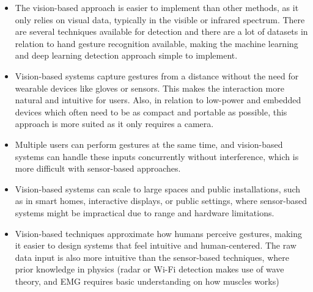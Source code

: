 \documentclass[12pt]{article}
\begin{document}
  \begin{itemize}
    \item The vision-based approach is easier to implement than other methods, as it only relies on visual data, typically in the visible or infrared spectrum. There are several techniques available for detection and there are a lot of datasets in relation to hand gesture recognition available, making the machine learning and deep learning detection approach simple to implement. 
    \item Vision-based systems capture gestures from a distance without the need for wearable devices like gloves or sensors. This makes the interaction more natural and intuitive for users. Also, in relation to low-power and embedded devices which often need to be as compact and portable as possible, this approach is more suited as it only requires a camera.
    \item Multiple users can perform gestures at the same time, and vision-based systems can handle these inputs concurrently without interference, which is more difficult with sensor-based approaches.
    \item Vision-based systems can scale to large spaces and public installations, such as in smart homes, interactive displays, or public settings, where sensor-based systems might be impractical due to range and hardware limitations.
    \item Vision-based techniques approximate how humans perceive gestures, making it easier to design systems that feel intuitive and human-centered. The raw data input is also more intuitive than the sensor-based techniques, where prior knowledge in physics (radar or Wi-Fi detection makes use of wave theory, and EMG requires basic understanding on how muscles works)
  \end{itemize}
\end{document}
